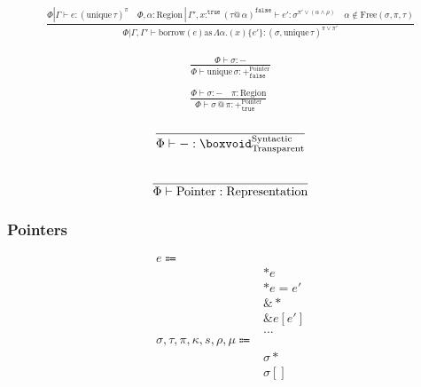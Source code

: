 \documentclass {article}
\begin{document}
\begin{gather*}
\frac
{\Phi | \Gamma \vdash e : (\text{unique} \, \tau)^\pi \quad \Phi,\alpha : \text{Region}  \, | \, \Gamma', x :^\texttt{true} (\tau @ \, \alpha)^\texttt{false} \vdash e' : \sigma^{\pi' \lor (\alpha \land \rho)} \quad \alpha \notin \text{Free}(\sigma, \pi, \tau)}
{\Phi | \Gamma, \Gamma' \vdash \text{borrow} (e) \text{as} \, \Lambda \alpha. (x) \{ e' \} : (\sigma, \text{unique} \, \tau)^{\pi \lor \pi'} }
\end{gather*}

\begin{gather*}
\frac
{\Phi \vdash \sigma : -}
{\Phi \vdash \text{unique} \, \sigma : +^\text{Pointer}_\texttt{false}} \\
\\
\frac
{\Phi \vdash \sigma : - \quad \pi : \text{Region}}
{\Phi \vdash \sigma \, @ \, \pi : +^\text{Pointer}_\texttt{true}} 
\end{gather*}

\begin{gather*}
\frac
{}
{\Phi \vdash - : \boxvoid^{\text{Syntactic}}_{\text{Transparent}}} \\
\\
\frac
{}
{\Phi \vdash \text{Pointer} : \text{Representation}} \\
\end{gather*}

\subsubsection{Pointers}
\begin{align*}
e \Coloneqq & \\
& *e \tag{Read Pointer} \\
& *e = e' \tag{Write Pointer} \\
& \& * \tag{Array to Pointer} \\
& \& e [e'] \tag{Array Increment} \\
& \dots \\
\sigma, \tau, \pi, \kappa, s, \rho, \mu \Coloneqq & \\
& \sigma* \tag{Pointer} \\
& \sigma[] \tag{Array Pointer} \\
\end{align*}
\end{document}
